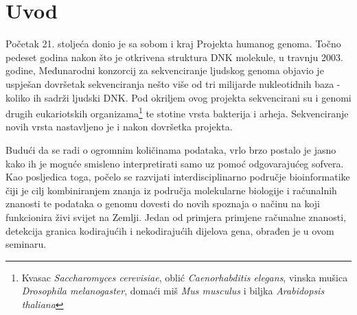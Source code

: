 \section*{Uvod}
\label{ch:intro}

Početak 21. stoljeća donio je sa sobom i kraj Projekta humanog genoma. Točno pedeset godina nakon što je otkrivena struktura DNK molekule\cite{Watson01}, u travnju 2003. godine, Međunarodni konzorcij za sekvenciranje ljudskog genoma objavio je uspješan dovršetak sekvenciranja nešto više od tri milijarde nukleotidnih baza - koliko ih sadrži ljudski DNK. Pod okriljem ovog projekta sekvencirani su i genomi drugih eukariotskih organizama\footnote{Kvasac \textit{Saccharomyces cerevisiae}, oblić \textit{Caenorhabditis elegans}, vinska mušica \textit{Drosophila melanogaster}, domaći miš \textit{Mus musculus} i biljka \textit{Arabidopsis thaliana} } te stotine vrsta bakterija i arheja. Sekvenciranje novih vrsta nastavljeno je i nakon dovršetka projekta\cite{Cox01}. 
\par
Budući da se radi o ogromnim količinama podataka, vrlo brzo postalo je jasno kako ih je moguće smisleno interpretirati samo uz pomoć odgovarajućeg sofvera. Kao posljedica toga, počelo se razvijati interdisciplinarno područje bioinformatike čiji je cilj kombiniranjem znanja iz područja molekularne biologije i računalnih znanosti te podataka o genomu dovesti do novih spoznaja o načinu na koji funkcionira živi svijet na Zemlji. Jedan od primjera primjene računalne znanosti, detekcija granica kodirajućih i nekodirajućih dijelova gena, obrađen je u ovom seminaru.

